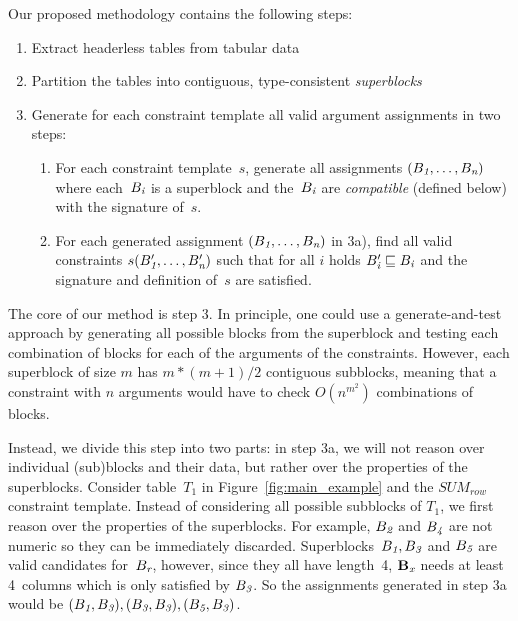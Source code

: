 Our proposed methodology contains the following steps:
\begin{enumerate}
\item Extract headerless tables from tabular data
\item Partition the tables into contiguous, type-consistent \textit{superblocks}
\item Generate for each constraint template all valid argument assignments in two steps:
\begin{enumerate}
\item For each constraint template~$s$, generate all assignments $(B_{\textit{1}}, \ldots ,B_{\textit{n}})$ where each~$B_{\textit{i}}$ is a superblock and the~$B_{\textit{i}}$ are \textit{compatible} (defined below) with the signature of~$s$. 
\item For each generated assignment $(B_{\textit{1}}, \ldots ,B_{\textit{n}})$ in 3a), find all valid constraints $s(B'_{\textit{1}}, \ldots, B'_{\textit{n}})$ such that for all $i$ holds $B'_{\textit{i}} \sqsubseteq B_{\textit{i}}$ and the signature and definition of~$s$ are satisfied.
\end{enumerate}
\end{enumerate}

The core of our method is step 3. In principle, one could use a generate-and-test approach by generating all possible blocks from the superblock and testing each combination of blocks for each of the arguments of the constraints. However, each superblock of size $m$ has $m*(m+1)/2$ contiguous subblocks, meaning that a constraint with $n$ arguments would have to check $O(n^{m^2})$ combinations of blocks.

Instead, we divide this step into two parts: in step 3a, we will not reason over individual (sub)blocks and their data, but rather over the properties of the superblocks.
Consider table~$T_1$ in Figure~\ref{fig:main_example} and the $\textit{SUM}_{row}$ constraint template.
Instead of considering all possible subblocks of $T_1$, we first reason over the properties of the superblocks.
For example, $B_{\textit{2}}$ and $B_{\textit{4}}$ are not numeric so they can be immediately discarded.
Superblocks~$B_{\textit{1}}, B_{\textit{3}}$ and $B_{\textit{5}}$ are valid candidates for~$B_{\textit{r}}$, however, since they all have length~4, $\mathbf{B_{\textit{x}}}$ needs at least 4~columns which is only satisfied by $B_{\textit{3}}$.
So the assignments generated in step 3a would be $(B_{\textit{1}}, B_{\textit{3}}), (B_{\textit{3}}, B_{\textit{3}}), (B_{\textit{5}}, B_{\textit{3}})$.

